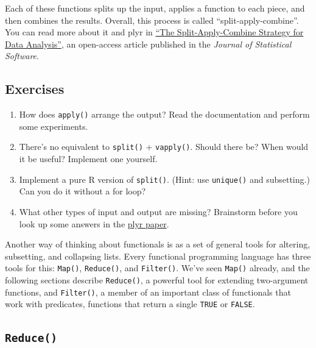 Each of these functions splits up the input, applies a function to each
piece, and then combines the results. Overall, this process is called
``split-apply-combine''. You can read more about it and plyr in
\href{http://www.jstatsoft.org/v40/i01/}{``The Split-Apply-Combine
Strategy for Data Analysis''}, an open-access article published in the
\emph{Journal of Statistical Software}.

\subsection{Exercises}

\begin{enumerate}
\def\labelenumi{\arabic{enumi}.}
\item
  How does \texttt{apply()} arrange the output? Read the documentation
  and perform some experiments.
\item
  There's no equivalent to \texttt{split()} + \texttt{vapply()}. Should
  there be? When would it be useful? Implement one yourself.
\item
  Implement a pure R version of \texttt{split()}. (Hint: use
  \texttt{unique()} and subsetting.) Can you do it without a for loop?
\item
  What other types of input and output are missing? Brainstorm before
  you look up some answers in the
  \href{http://www.jstatsoft.org/v40/i01/}{plyr paper}.
\end{enumerate}


Another way of thinking about functionals is as a set of general tools
for altering, subsetting, and collapsing lists. Every functional
programming language has three tools for this: \texttt{Map()},
\texttt{Reduce()}, and \texttt{Filter()}. We've seen \texttt{Map()}
already, and the following sections describe \texttt{Reduce()}, a
powerful tool for extending two-argument functions, and
\texttt{Filter()}, a member of an important class of functionals that
work with predicates, functions that return a single \texttt{TRUE} or
\texttt{FALSE}.

\subsection{\texttt{Reduce()}}


